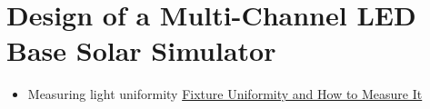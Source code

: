 \chapter{Design of a Multi-Channel LED Base Solar Simulator}\label{appendix:solar_simulator}

\begin{itemize}
    \item Measuring light uniformity \href{https://eyehortilux.com/grow-lighting-guide/systems/fixture-uniformity-and-efficiency/}{Fixture Uniformity and How to Measure It}
\end{itemize}
